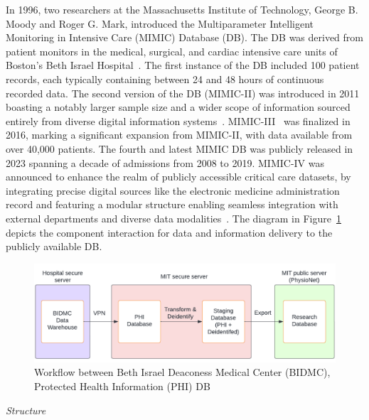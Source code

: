 In 1996, two researchers at the Massachusetts Institute of Technology, George B. Moody and Roger G. Mark, introduced the Multiparameter Intelligent Monitoring in Intensive Care (MIMIC) Database (DB).
The DB was derived from patient monitors in the medical, surgical, and cardiac intensive care units of Boston’s Beth Israel Hospital~\cite{moodyDatabaseSupportDevelopment1996}.
The first instance of the DB included 100 patient records, each typically containing between 24 and 48 hours of continuous recorded data.
The second version of the DB (MIMIC-II) was introduced in 2011 boasting a notably larger sample size and a wider scope of information sourced entirely from diverse digital information systems~\cite{saeedMultiparameterIntelligentMonitoring2011}.
MIMIC-III~\cite{johnsonMIMICIIIFreelyAccessible2016} was finalized in 2016, marking a significant expansion from MIMIC-II, with data available from over 40,000 patients.
The fourth and latest MIMIC DB was publicly released in 2023 spanning a decade of admissions from 2008 to 2019.
MIMIC-IV was announced to enhance the realm of publicly accessible critical care datasets, by integrating precise digital sources like the electronic medicine administration record and featuring a modular structure enabling seamless integration with external departments and diverse data modalities~\cite{johnsonMIMICIVFreelyAccessible2023}.
The diagram in Figure~\ref{fig:mimic_workflow} depicts the component interaction for data and information delivery to the publicly available DB\@.

\begin{figure}[h]
    \centering
    \includegraphics[scale=0.6]{images/mimic/mimic_workflow}
    \caption{Workflow between Beth Israel Deaconess Medical Center (BIDMC), Protected Health Information (PHI) DB ~\cite{charltonMIMICWFDBTutorials2022}}
    \label{fig:mimic_workflow}
\end{figure}

\vspace{0.2cm}
\textit{Structure}
\vspace{0.2cm}

